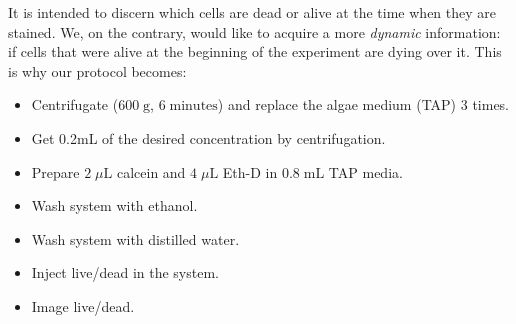 It is intended to discern which cells are dead or alive at the time when they are stained. We, on the contrary, would like to acquire a more \textit{dynamic} information: if cells that were alive at the beginning of the experiment are dying over it. This is why our protocol becomes:

\begin{itemize}
	\item Centrifugate ($600 \; \textrm{g}$, $6 \; \textrm{minutes}$) and replace the algae medium (TAP) 3 times.
	\item Get 0.2mL of the desired concentration by centrifugation. 
	\item Prepare $2 \; \mu \textrm{L}$ calcein and $4 \; \mu \textrm{L}$ Eth-D in $0.8 \; \textrm{mL}$ TAP media.
	\item Wash system with ethanol.
	\item Wash system with distilled water.
	\item Inject live/dead in the system.
	\item Image live/dead.
\end{itemize}

